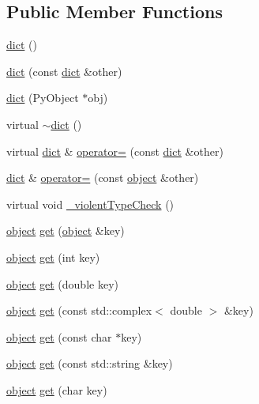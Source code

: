 \subsection*{Public Member Functions}
\begin{DoxyCompactItemize}
\item 
\hyperlink{classpy_1_1dict_a2a82bb32247020c59ce2c3623af69c57}{dict} ()
\item 
\hyperlink{classpy_1_1dict_aaf0ebd55a918a2c1995f4caf5c2a482d}{dict} (const \hyperlink{classpy_1_1dict}{dict} \&other)
\item 
\hyperlink{classpy_1_1dict_a920eaa52cb4d784ca3fd921fe90e5417}{dict} (Py\+Object $\ast$obj)
\item 
virtual \hyperlink{classpy_1_1dict_a8f59e8720fff839974d25f2d6909805f}{$\sim$dict} ()
\item 
virtual \hyperlink{classpy_1_1dict}{dict} \& \hyperlink{classpy_1_1dict_aeeacadb1f4a80dee56688fd63375d8e2}{operator=} (const \hyperlink{classpy_1_1dict}{dict} \&other)
\item 
\hyperlink{classpy_1_1dict}{dict} \& \hyperlink{classpy_1_1dict_aa21107ee275962b467f58613f72f7760}{operator=} (const \hyperlink{classpy_1_1object}{object} \&other)
\item 
virtual void \hyperlink{classpy_1_1dict_ade99e48005a092bfc65daa0853f002be}{\+\_\+violent\+Type\+Check} ()
\item 
\hyperlink{classpy_1_1object}{object} \hyperlink{classpy_1_1dict_a46998db80993972b9e55c30bc67ffd03}{get} (\hyperlink{classpy_1_1object}{object} \&key)
\item 
\hyperlink{classpy_1_1object}{object} \hyperlink{classpy_1_1dict_a621964bfb35edd4823e35cd35abe1375}{get} (int key)
\item 
\hyperlink{classpy_1_1object}{object} \hyperlink{classpy_1_1dict_a2f2e2a63afde4a7092581ed2a8bf9ce3}{get} (double key)
\item 
\hyperlink{classpy_1_1object}{object} \hyperlink{classpy_1_1dict_ab5745a59b7505fb87b8516c039aedb53}{get} (const std\+::complex$<$ double $>$ \&key)
\item 
\hyperlink{classpy_1_1object}{object} \hyperlink{classpy_1_1dict_a0d127184cf5098db16a7c961dd3e49be}{get} (const char $\ast$key)
\item 
\hyperlink{classpy_1_1object}{object} \hyperlink{classpy_1_1dict_a6c6ce4a376ef598ae48de47957173f0c}{get} (const std\+::string \&key)
\item 
\hyperlink{classpy_1_1object}{object} \hyperlink{classpy_1_1dict_a12e4d59b5a053620681f278819560be9}{get} (char key)

\end{DoxyCompactItemize}
